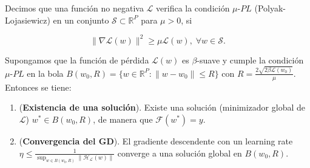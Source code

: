 \begin{definicion}[Condición $\mu$-$PL$]
    Decimos que una función no negativa $\mathcal{L}$ verifica la condición $\mu$-$PL$ (Polyak-Lojasiewicz) en un conjunto $\mathcal{S} \subset \mathbb{R}^{P}$ para $\mu > 0$, si

    \[
        \| \nabla \mathcal{L}(w) \|^{2} \geq \mu \mathcal{L}(w), \; \forall w \in \mathcal{S}.
    \]\newline
\end{definicion}

\begin{teorema}
    Supongamos que la función de pérdida $\mathcal{L}(w)$ es $\beta$-suave y cumple la condición $\mu$-$PL$ en la bola $B(w_0, R) = \{ w \in \mathbb{R}^{P} : \| w - w_0 \| \leq R \}$ con $R = \frac{2 \sqrt{2 \beta \mathcal{L}(w_0)}}{\mu}$. Entonces se tiene:

    \begin{enumerate}
        \item (\textbf{Existencia de una solución}). Existe una solución (minimizador global de $\mathcal{L}$) $w^{*} \in B(w_0, R)$, de manera que $\mathcal{F}(w^{*}) = y$.
        \item (\textbf{Convergencia del GD}). El gradiente descendente con un learning rate $\eta \leq \frac{1}{\sup_{w \in B(w_0, R)} \| \mathcal{H}_{\mathcal{L}}(w) \|}$ converge a una solución global en $B(w_0, R)$.
    \end{enumerate}
\end{teorema}

